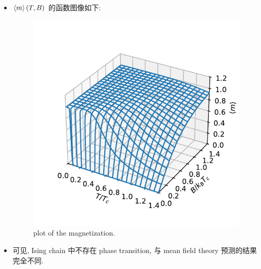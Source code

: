 \begin{itemize}
	\item $\braket{m}(T, B)$ 的函数图像如下:
	
	\begin{figure}[H]
		\centering
		\includegraphics[scale=0.8]{figures/plot of the magnetization.pdf}
		\caption{plot of the magnetization.}
	\end{figure}
	
	\item 可见, Ising chain 中不存在 phase transition, 与 mean field theory 预测的结果完全不同.
\end{itemize}

